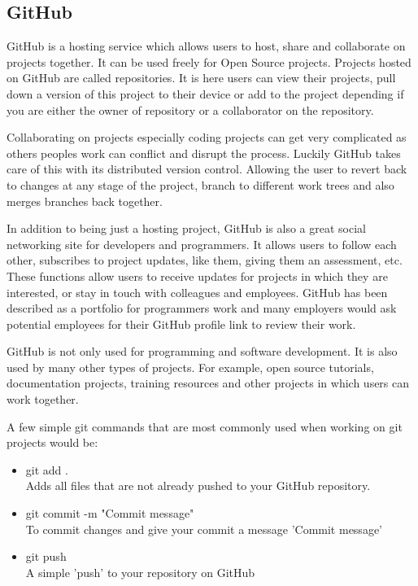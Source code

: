 \documentclass[12pt,a4paper,oneside,openany]{book}
\begin{document}
\subsection{GitHub}
GitHub is a hosting service which allows users to host, share and collaborate on projects together. It can be used freely for Open Source projects. Projects hosted on GitHub are called repositories. It is here users can view their projects, pull down a version of this project to their device or add to the project depending if you are either the owner of repository or a collaborator on the repository.

Collaborating on projects especially coding projects can get very complicated as others peoples work can conflict and disrupt the process. Luckily GitHub takes care of this with its distributed version control. Allowing the user to revert back to changes at any stage of the project, branch to different work trees and also merges branches back together.

In addition to being just a hosting project, GitHub is also a great social networking site for developers and programmers. It allows users to follow each other, subscribes to project updates, like them, giving them an assessment, etc. These functions allow users to receive updates for projects in which they are interested, or stay in touch with colleagues and employees. GitHub has been described as a portfolio for programmers work and many employers would ask potential employees for their GitHub profile link to review their work.

GitHub is not only used for programming and software development. It is also used by many other types of projects. For example, open source tutorials, documentation projects, training resources and other projects in which users can work together. \cite{github}

A few simple git commands that are most commonly used when working on git projects would be:

\begin{itemize}

    \item git add . \\
    Adds all files that are not already pushed to your GitHub repository.
    
    \item git commit -m "Commit message" \\
    To commit changes and give your commit a message 'Commit message'
    
    \item git push  \\
    A simple 'push' to your repository on GitHub 
\end{itemize}
\end{document}
